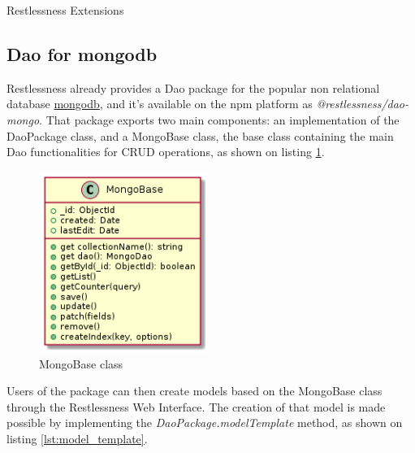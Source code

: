 \begin{chapter}{Restlessness Extensions}
    \subsection{Dao for mongodb}
    Restlessness already provides a Dao package for the popular non relational
    database \href{https://www.mongodb.com/}{mongodb}, and it's available on the
    npm platform as \mbox{\textit{@restlessness/dao-mongo}}.
    That package exports two main components: an implementation of the DaoPackage
    class, and a MongoBase class, the base class containing the main Dao
    functionalities for CRUD operations, as shown on listing \ref{fig:mongobase}.

    \begin{figure}
        \centering
        \includegraphics[width=5.5cm]{source/diagrams/mongobase_class.png}
        \caption{MongoBase class}
        \label{fig:mongobase}
    \end{figure}

    Users of the package can then create models based on the MongoBase class through
    the Restlessness Web Interface.
    The creation of that model is made possible by implementing the
    \textit{DaoPackage.modelTemplate} method, as shown on listing \ref{lst:model_template}.

    \bigskip


\end{chapter}
